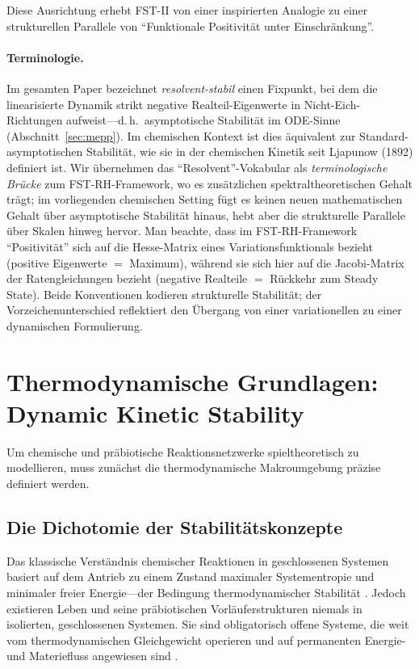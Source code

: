 \documentclass[12pt,a4paper]{article}
\theoremstyle{remark}
\begin{document}
Diese Ausrichtung erhebt FST-II von einer inspirierten Analogie zu einer strukturellen Parallele von ``Funktionale Positivit\"at unter Einschr\"ankung''.

\paragraph{Terminologie.} Im gesamten Paper bezeichnet \emph{resolvent-stabil} einen Fixpunkt, bei dem die linearisierte Dynamik strikt negative Realteil-Eigenwerte in Nicht-Eich-Richtungen aufweist---d.\,h.\ asymptotische Stabilit\"at im ODE-Sinne (Abschnitt~\ref{sec:mepp}). Im chemischen Kontext ist dies \"aquivalent zur Standard-asymptotischen Stabilit\"at, wie sie in der chemischen Kinetik seit Ljapunow (1892) definiert ist. Wir \"ubernehmen das ``Resolvent''-Vokabular als \emph{terminologische Br\"ucke} zum FST-RH-Framework, wo es zus\"atzlichen spektraltheoretischen Gehalt tr\"agt; im vorliegenden chemischen Setting f\"ugt es keinen neuen mathematischen Gehalt \"uber asymptotische Stabilit\"at hinaus, hebt aber die strukturelle Parallele \"uber Skalen hinweg hervor. Man beachte, dass im FST-RH-Framework \citep{GeigerRH2026b} ``Positivit\"at'' sich auf die Hesse-Matrix eines Variationsfunktionals bezieht (positive Eigenwerte $=$ Maximum), w\"ahrend sie sich hier auf die Jacobi-Matrix der Ratengleichungen bezieht (negative Realteile $=$ R\"uckkehr zum Steady State). Beide Konventionen kodieren strukturelle Stabilit\"at; der Vorzeichenunterschied reflektiert den \"Ubergang von einer variationellen zu einer dynamischen Formulierung.

\section{Thermodynamische Grundlagen: Dynamic Kinetic Stability}
\label{sec:thermodynamics}

Um chemische und pr\"abiotische Reaktionsnetzwerke spieltheoretisch zu modellieren, muss zun\"achst die thermodynamische Makroumgebung pr\"azise definiert werden.

\subsection{Die Dichotomie der Stabilit\"atskonzepte}

Das klassische Verst\"andnis chemischer Reaktionen in geschlossenen Systemen basiert auf dem Antrieb zu einem Zustand maximaler Systementropie und minimaler freier Energie---der Bedingung thermodynamischer Stabilit\"at \citep{Pross2012}. Jedoch existieren Leben und seine pr\"abiotischen Vorl\"auferstrukturen niemals in isolierten, geschlossenen Systemen. Sie sind obligatorisch offene Systeme, die weit vom thermodynamischen Gleichgewicht operieren und auf permanenten Energie- und Materiefluss angewiesen sind \citep{Bioenergetics}.
\end{document}
